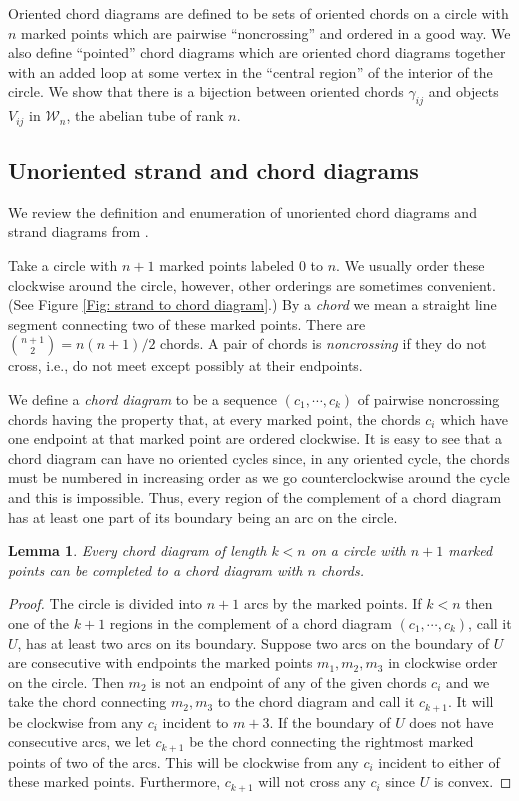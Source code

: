 \documentclass[11pt]{amsart}
\newtheorem{lem}[thm]{Lemma}
\theoremstyle{definition}
\theoremstyle{remark}
\numberwithin{equation}{section}
\newcommand{\cW}{\ensuremath{{\mathcal{W}}}}
\begin{document}
Oriented chord diagrams are defined to be sets of oriented chords on a circle with $n$ marked points which are pairwise ``noncrossing'' and ordered in a good way. We also define ``pointed'' chord diagrams which are oriented chord diagrams together with an added loop at some vertex in the ``central region'' of the interior of the circle. We show that there is a bijection between oriented chords $\gamma_{ij}$ and objects $V_{ij}$ in $\cW_n$, the abelian tube of rank $n$.

\subsection{Unoriented strand and chord diagrams}\label{ss: unoriented chords}

We review the definition and enumeration of unoriented chord diagrams and strand diagrams from \cite{GIMO}.

Take a circle with $n+1$ marked points labeled $0$ to $n$. We usually order these clockwise around the circle, however, other orderings are sometimes convenient. (See Figure \ref{Fig: strand to chord diagram}.) By a \emph{chord} we mean a straight line segment connecting two of these marked points. There are $\binom{n+1}2=n(n+1)/2$ chords. A pair of chords is \emph{noncrossing} if they do not cross, i.e., do not meet except possibly at their endpoints. 

We define a \emph{chord diagram} to be a sequence $(c_1,\cdots,c_k)$ of pairwise noncrossing chords having the property that, at every marked point, the chords $c_i$ which have one endpoint at that marked point are ordered clockwise. It is easy to see that a chord diagram can have no oriented cycles since, in any oriented cycle, the chords must be numbered in increasing order as we go counterclockwise around the cycle and this is impossible. Thus, every region of the complement of a chord diagram has at least one part of its boundary being an arc on the circle.

\begin{lem}\label{lem: chord diagrams can be completed}
Every chord diagram of length $k<n$ on a circle with $n+1$ marked points can be completed to a chord diagram with $n$ chords.
\end{lem}

\begin{proof}
The circle is divided into $n+1$ arcs by the marked points. If $k<n$ then one of the $k+1$ regions in the complement of a chord diagram $(c_1,\cdots,c_k)$, call it $U$, has at least two arcs on its boundary. Suppose two arcs on the boundary of $U$ are consecutive with endpoints the marked points $m_1,m_2,m_3$ in clockwise order on the circle. Then $m_2$ is not an endpoint of any of the given chords $c_i$ and we take the chord connecting $m_2,m_3$ to the chord diagram and call it $c_{k+1}$. It will be clockwise from any $c_i$ incident to $m+3$. If the boundary of $U$ does not have consecutive arcs, we let $c_{k+1}$ be the chord connecting the rightmost marked points of two of the arcs. This will be clockwise from any $c_i$ incident to either of these marked points. Furthermore, $c_{k+1}$ will not cross any $c_i$ since $U$ is convex.
\end{proof}
\end{document}
